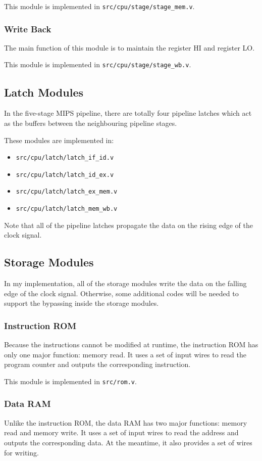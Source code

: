 \documentclass{article}
\begin{document}
This module is implemented in \texttt{src/cpu/stage/stage\_mem.v}.

\newpage
\subsubsection{Write Back}
The main function of this module is to maintain the register HI and register LO.


This module is implemented in \texttt{src/cpu/stage/stage\_wb.v}.

\subsection{Latch Modules}
In the five-stage MIPS pipeline, there are totally four pipeline latches which act as the buffers between the neighbouring pipeline stages. 

These modules are implemented in:
\begin{itemize}
\item
\texttt{src/cpu/latch/latch\_if\_id.v}
\item
\texttt{src/cpu/latch/latch\_id\_ex.v}
\item
\texttt{src/cpu/latch/latch\_ex\_mem.v}
\item
\texttt{src/cpu/latch/latch\_mem\_wb.v}
\end{itemize}
Note that all of the pipeline latches propagate the data on the rising edge of the clock signal.

\subsection{Storage Modules}
In my implementation, all of the storage modules write the data on the falling edge of the clock signal. Otherwise, some additional codes will be needed to support the bypassing inside the storage modules.

\subsubsection{Instruction ROM}
Because the instructions cannot be modified at runtime, the instruction ROM has only one major function: memory read. It uses a set of input wires to read the program counter and outputs the corresponding instruction.

This module is implemented in \texttt{src/rom.v}.

\subsubsection{Data RAM}
Unlike the instruction ROM, the data RAM has two major functions: memory read and memory write. It uses a set of input wires to read the address and outputs the corresponding data. At the meantime, it also provides a set of wires for writing.
\end{document}
